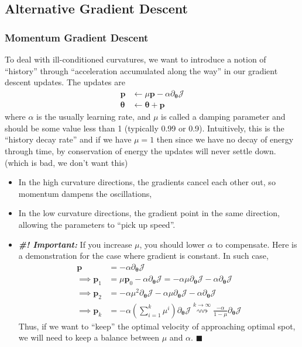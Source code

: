 \documentclass[11pt]{article}
\newcommand{\bp}{\mathbf{p}}
\newcommand{\qed}{\hfill $\blacksquare$}
\begin{document}
\subsection{Alternative Gradient Descent}
\subsubsection{Momentum Gradient Descent}
To deal with ill-conditioned curvatures, we want to introduce a notion of ``history'' through ``acceleration accumulated along the way'' in our gradient descent updates. The updates are
\begin{align}
    \mathbf{p} &\gets \mu\mathbf{p} - \alpha \partial_{\boldsymbol{\theta}} \mathcal{J} \\
    \boldsymbol{\theta} &\gets \boldsymbol{\theta} + \bp
\end{align}
where $\alpha$ is the usually learning rate, and $\mu$ is called a damping parameter and should be some value less than 1 (typically 0.99 or 0.9). Intuitively, this is the ``history decay rate'' and if we have $\mu = 1$ then since we have no decay of energy through time, by conservation of energy the updates will never settle down. (which is bad, we don't want this)
\begin{itemize}
    \item In the high curvature directions, the gradients cancel each other out, so momentum dampens the oscillations, 
    \item In the low curvature directions, the gradient point in the same direction, allowing the parameters to ``pick up speed''.
    \item \textit{\textbf{\#! Important:}} If you increase $\mu$, you should lower $\alpha$ to compensate. Here is a demonstration for the case where gradient is constant. In such case, 
        \begin{align}
            \bp &= -\alpha \partial_{\boldsymbol{\theta}}\mathcal{J} \\
            \implies \bp_1 &= \mu \bp_0 - \alpha \partial_{\boldsymbol{\theta}} \mathcal{J} = - \alpha \mu \partial_{\boldsymbol{\theta}} \mathcal{J} - \alpha \partial_{\boldsymbol{\theta}} \mathcal{J} \\
            \implies \bp_2 &= - \alpha\mu^2 \partial_{\boldsymbol{\theta}} \mathcal{J} - \alpha\mu \partial_{\boldsymbol{\theta}} \mathcal{J} - \alpha \partial_{\boldsymbol{\theta}} \mathcal{J} \\
            \implies \bp_k &= -\alpha \left(\sum_{i = 1}^k \mu^i\right) \partial_{\boldsymbol{\theta}} \mathcal{J} \overset{k\rightarrow\infty}{\rightsquigarrow} \frac{-\alpha}{1 - \mu} \partial_{\boldsymbol{\theta}} \mathcal{J}
        \end{align}
    Thus, if we want to ``keep'' the optimal velocity of approaching optimal spot, we will need to keep a balance between $\mu$ and $\alpha$. \qed
\end{itemize}
\end{document}
